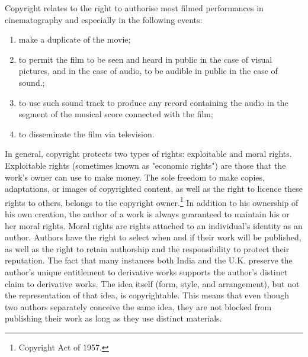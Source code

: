 \begin{multicols}{2}
\noi
Copyright relates to the right to authorise most filmed performances in cinematography and
especially in the following events:

\begin{enumerate}[label=$\bullet$]
\item make a duplicate of the movie;

\item to permit the film to be seen and heard in public in the case of visual pictures, and in
the case of audio, to be audible in public in the case of sound.;

\item to use such sound track to produce any record containing the audio in the segment of
the musical score connected with the film;

\item to disseminate the film via television.
\end{enumerate}

\vspace{-.2cm}

\noi
In general, copyright protects two types of rights: exploitable and moral rights. Exploitable
rights (sometimes known as "economic rights") are those that the work's owner can use to
make money. The sole freedom to make copies, adaptations, or images of copyrighted
content, as well as the right to licence these rights to others, belongs to the copyright owner.\footnote{Copyright Act of 1957.}
In addition to his ownership of his own creation, the author of a work is always guaranteed to
maintain his or her moral rights. Moral rights are rights attached to an individual's identity as
an author. Authors have the right to select when and if their work will be published, as well
as the right to retain authorship and the responsibility to protect their reputation. The fact that
many instances both India and the U.K. preserve the author's unique entitlement to derivative
works supports the author's distinct claim to derivative works. The idea itself (form, style,
and arrangement), but not the representation of that idea, is copyrightable. This means that
even though two authors separately conceive the same idea, they are not blocked from
publishing their work as long as they use distinct materials.


\end{multicols}
